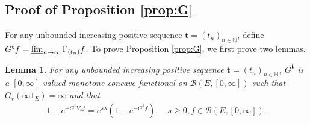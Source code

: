\documentclass[12pt,a4paper]{amsart}
\numberwithin{equation}{section}
\theoremstyle{plain}
\newtheorem{lem}[thm]{Lemma}
\theoremstyle{definition}
\theoremstyle{remark}
\begin{document}
\subsection{Proof of Proposition \ref{prop:G}}\label{sec:G}
	For any unbounded increasing positive sequence $\mathbf t = (t_n)_{n\in \mathbb N}$, define $G^\mathbf t f = \varliminf_{n\to \infty} \Gamma_{(t_n)} f$.
%
	To prove Proposition \ref{prop:G}, we first prove two lemmas.

\begin{lem} \label{prop:Gtb:H1:H2:H3:H4}
	For any unbounded increasing positive sequence $\mathbf t = (t_n)_{n\in \mathbb N}$,
	$G^\mathbf t$ is a $[0,\infty]$-valued monotone concave functional on $\mathcal B(E,[0,\infty])$ such that $G_r(\infty 1_E) = \infty$ and that
	\begin{align}
	1 - e^{-G^\mathbf t V_s f}
	= e^{s\lambda} (1-e^{- G^\mathbf t f}),
	\quad s\geq 0, f\in \mathcal B(E,[0,\infty]).
	\end{align}
\end{lem}
\end{document}
